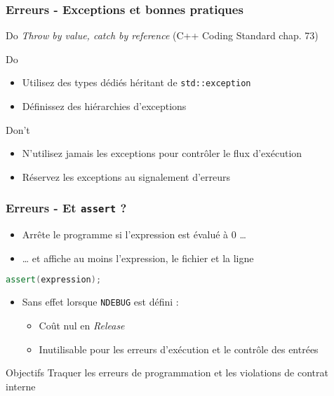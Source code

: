 \documentclass[C++.tex]{subfiles}
\begin{document}
\begin{frame}
	\frametitle{Erreurs - Exceptions et bonnes pratiques}
	\begin{exampleblock}{Do}
		\textit{Throw by value, catch by reference} (\og C++ Coding Standard\fg{} chap. 73)
	\end{exampleblock}

	\begin{exampleblock}{Do}
		\begin{itemize}
			\item Utilisez des types dédiés héritant de \lstinline|std::exception|
			\item Définissez des hiérarchies d'exceptions
		\end{itemize}
	\end{exampleblock}

	\begin{alertblock}{Don't}
		\begin{itemize}
			\item N'utilisez jamais les exceptions pour contrôler le flux d'exécution
			\item Réservez les exceptions au signalement d'erreurs

		\end{itemize}
	\end{alertblock}
\end{frame}

\begin{frame}[fragile]
	\frametitle{Erreurs - Et \lstinline|assert| ?}
	\begin{itemize}
		\item Arrête le programme si l'expression est évalué à 0 \ldots
		\item \ldots{} et affiche au moins l'expression, le fichier et la ligne
	\end{itemize}

	\begin{lstlisting}[language=C++]
assert(expression);\end{lstlisting}

	\begin{itemize}
		\item Sans effet lorsque \lstinline|NDEBUG| est défini :
		\begin{itemize}
			\item Coût nul en \textit{Release}
			\item Inutilisable pour les erreurs d'exécution et le contrôle des entrées
		\end{itemize}
	\end{itemize}

	\begin{block}{Objectifs}
		Traquer les erreurs de programmation et les violations de contrat interne
	\end{block}
\end{frame}
\end{document}

